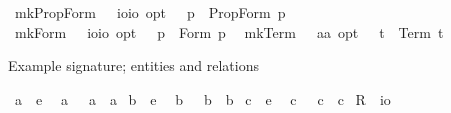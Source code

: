 \begin{isabellebody}
\isamarkuptrue%
\isamarkupfalse%
\ mkPropForm\ {\isacharcolon}{\isacharcolon}\ \ {\isachardoublequoteopen}io{\isasymRightarrow}io\ opt{\isachardoublequoteclose}\ \ \ {\isachardoublequoteopen}{\isacharcomma}p{\isacharcomma}\ {\isasymequiv}\ PropForm\ p{\isachardoublequoteclose}\ \isanewline
{}\isamarkupfalse%
\ mkForm\ {\isacharcolon}{\isacharcolon}\ \ {\isachardoublequoteopen}io{\isasymRightarrow}io\ opt{\isachardoublequoteclose}\ \ \ {\isachardoublequoteopen}{\isacharsemicolon}p{\isacharsemicolon}\ {\isasymequiv}\ Form\ p{\isachardoublequoteclose}\ \isanewline
{}\isamarkupfalse%
\ mkTerm\ {\isacharcolon}{\isacharcolon}\ \ {\isachardoublequoteopen}{\isacharprime}a{\isasymRightarrow}{\isacharprime}a\ opt{\isachardoublequoteclose}\ \ \ {\isachardoublequoteopen}{\isachardot}t{\isachardot}\ {\isasymequiv}\ Term\ t{\isachardoublequoteclose}%
\isamarkuptrue%
%
\begin{isamarkuptext}%
Example signature; entities and relations%
\end{isamarkuptext}%
\isamarkuptrue%
\isamarkupfalse%
\ a{\isacharunderscore}{}\ {\isacharcolon}{\isacharcolon}\ {\isachardoublequoteopen}e{\isachardoublequoteclose}\ \isamarkupfalse%
\ a\ \ \ {\isachardoublequoteopen}a\ {\isasymequiv}\ {\isachardot}a{\isacharunderscore}{}{\isachardot}{\isachardoublequoteclose}\isanewline
{}\isamarkupfalse%
\ b{\isacharunderscore}{}\ {\isacharcolon}{\isacharcolon}\ {\isachardoublequoteopen}e{\isachardoublequoteclose}\ \isamarkupfalse%
\ b\ \ \ {\isachardoublequoteopen}b\ {\isasymequiv}\ {\isachardot}b{\isacharunderscore}{}{\isachardot}{\isachardoublequoteclose}\isanewline
{}\isamarkupfalse%
\ c{\isacharunderscore}{}\ {\isacharcolon}{\isacharcolon}\ {\isachardoublequoteopen}e{\isachardoublequoteclose}\ \isamarkupfalse%
\ c\ \ \ {\isachardoublequoteopen}c\ {\isasymequiv}\ {\isachardot}c{\isacharunderscore}{}{\isachardot}{\isachardoublequoteclose}\isanewline
\isanewline
{}\isamarkupfalse%
\ R{\isacharunderscore}{}\ {\isacharcolon}{\isacharcolon}\ {\isachardoublequoteopen}io{\isachardoublequoteclose}\ \ \isamarkupfalse%

\end{isabellebody}
